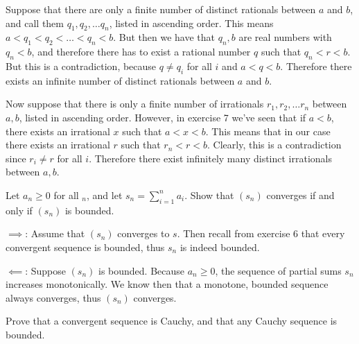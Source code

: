 \begin{solution}

    Suppose that there are only a finite number of distinct rationals between $a$ and $b$, and call them $q_1, q_2, \ldots q_n$, listed in ascending order. This means $a < q_1 < q_2 < \ldots < q_n < b$. But then we have that $q_n, b$ are real numbers with $q_n < b$, and therefore there has to exist a rational number $q$ such that $q_n < r < b$. But this is a contradiction, because $q \neq q_i$ for all $i$ and $a < q < b$. Therefore there exists an infinite number of distinct rationals between $a$ and $b$.

    Now suppose that there is only a finite number of irrationals $r_1, r_2, \ldots r_n$ between $a, b$, listed in ascending order. However, in exercise 7 we've seen that if $a < b$, there exists an irrational $x$ such that $a < x < b$. This means that in our case there exists an irrational $r$ such that $r_n < r <b$. Clearly, this is a contradiction since $r_i \neq r$ for all $i$. Therefore there exist infinitely many distinct irrationals between $a, b$.
\end{solution}

\begin{exercise}{13}
    Let $a_n \geq 0$ for all $_n$, and let $s_n = \sum_{i=1}^{n}a_i$. Show that $(s_n)$ converges if and only if $(s_n)$ is bounded.
\end{exercise}

\begin{solution}

    $\implies$: Assume that $(s_n)$ converges to $s$. Then recall from exercise 6 that every convergent sequence is bounded, thus $s_n$ is indeed bounded.

    
    $\impliedby$: Suppose $(s_n)$ is bounded. Because $a_n \geq 0$, the sequence of partial sums $s_n$ increases monotonically. We know then that a monotone, bounded sequence always converges, thus $(s_n)$  converges.
\end{solution}

\begin{exercise}{14}
    Prove that a convergent sequence is Cauchy, and that any Cauchy sequence is bounded.
\end{exercise}

